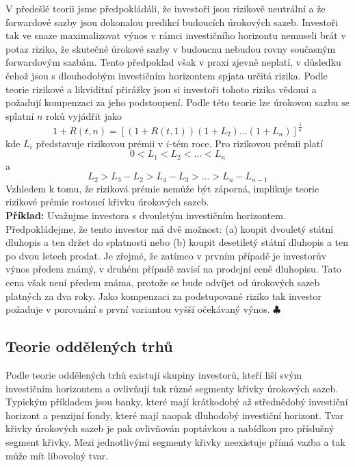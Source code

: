 \documentclass[a4paper]{book}
\begin{document}
V předešlé teorii jsme předpokládáli, že investoři jsou rizikově neutrální a že forwardové sazby jsou dokonalou predikcí budoucích úrokových sazeb. Investoři tak ve snaze maximalizovat výnos v rámci investičního horizontu nemuseli brát v potaz riziko, že skutečné úrokové sazby v budoucnu nebudou rovny současným forwardovým sazbám. Tento předpoklad však v praxi zjevně neplatí, v důsledku čehož jsou s dlouhodobým investičním horizontem spjata určitá rizika. Podle teorie rizikové a likviditní přirážky jsou si investoři tohoto rizika vědomi a požadují kompenzaci za jeho podstoupení. Podle této teorie lze úrokovou sazbu se splatní $n$ roků vyjádřit jako
\begin{equation*}
1 + R(t, n) = [(1 + R(t,1))(1 + L_2)  ... (1 + L_n)]^{\frac{1}{n}}
\end{equation*}
kde $L_i$ představuje rizikovou prémii v $i$-tém roce. Pro rizikovou prémii platí
\begin{equation*}
0 < L_1 < L_2 < ... < L_n
\end{equation*}
a
\begin{equation*}
L_2 > L_3 - L_2 > L_4 - L_3 > ... > L_n - L_{n-1}
\end{equation*}
Vzhledem k tomu, že riziková prémie nemůže být záporná, implikuje teorie rizikové prémie rostoucí křivku úrokových sazeb.\\

\noindent \textbf{Příklad:} Uvažujme investora s dvouletým investičním horizontem. Předpokládejme, že tento investor má dvě možnost: (a) koupit dvouletý státní dluhopis a ten držet do splatnosti nebo (b) koupit desetiletý státní dluhopis a ten po dvou letech prodat. Je zřejmé, že zatímco v prvním případě je investorův výnos předem známý, v druhém případě zavisí na prodejní ceně dluhopisu. Tato cena však není předem známa, protože se bude odvíjet od úrokových sazeb platných za dva roky. Jako kompenzaci za podstupované riziko tak investor požaduje v porovnání s první variantou vyšší očekávaný výnos. $\clubsuit$

\subsection{Teorie oddělených trhů}

Podle teorie oddělených trhů existují skupiny investorů, kteří liší svým investičním horizontem a ovlivňují tak různé segmenty křivky úrokových sazeb. Typickým příkladem jsou banky, které mají krátkodobý až střednědobý investiční horizont a penzijní fondy, které mají naopak dluhodobý investiční horizont. Tvar křivky úrokových sazeb je pak ovlivňován poptávkou a nabídkou pro příslušný segment křivky. Mezi jednotlivými segmenty křivky neexistuje přímá vazba a tak může mít libovolný tvar. 
\end{document}
